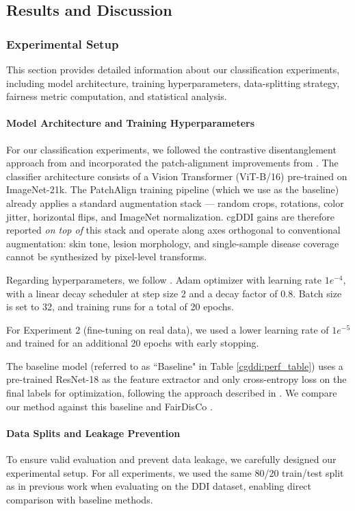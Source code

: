 \documentclass[11pt]{ucthesis}
\begin{document}
\subsection{Results and Discussion}

\subsubsection{Experimental Setup}

This section provides detailed information about our classification experiments, including model architecture, training hyperparameters, data-splitting strategy, fairness metric computation, and statistical analysis.

\paragraph{Model Architecture and Training Hyperparameters}
For our classification experiments, we followed the contrastive disentanglement approach from \cite{du_2023_fairdisco} and incorporated the patch-alignment improvements from \cite{aayushman-2024}. The classifier architecture consists of a Vision Transformer (ViT-B/16) pre-trained on ImageNet-21k. The PatchAlign training pipeline (which we use as the baseline) already applies a standard augmentation stack --- random crops, rotations, color jitter, horizontal flips, and ImageNet normalization. cgDDI gains are therefore reported \emph{on top of} this stack and operate along axes orthogonal to conventional augmentation: skin tone, lesion morphology, and single-sample disease coverage cannot be synthesized by pixel-level transforms.

Regarding hyperparameters, we follow \cite{aayushman-2024}. Adam optimizer with learning rate $1e^{-4}$, with a linear decay scheduler at step size 2 and a decay factor of 0.8. Batch size is set to 32, and training runs for a total of 20 epochs.

For Experiment 2 (fine-tuning on real data), we used a lower learning rate of $1e^{-5}$ and trained for an additional 20 epochs with early stopping.

The baseline model (referred to as ``Baseline" in Table \ref{cgddi:perf_table}) uses a pre-trained ResNet-18 as the feature extractor and only cross-entropy loss on the final labels for optimization, following the approach described in \cite{aayushman-2024}. We compare our method against this baseline and FairDisCo \cite{du_2023_fairdisco}.

\paragraph{Data Splits and Leakage Prevention}
To ensure valid evaluation and prevent data leakage, we carefully designed our experimental setup. For all experiments, we used the same 80/20 train/test split as in previous work \cite{du_2023_fairdisco, aayushman-2024} when evaluating on the DDI dataset, enabling direct comparison with baseline methods.
\end{document}
